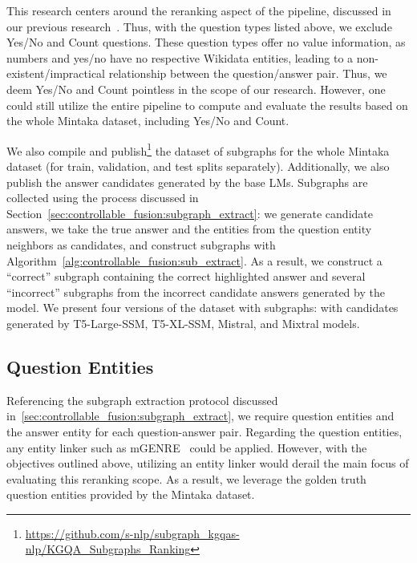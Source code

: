 This research centers around the reranking aspect of the pipeline, discussed in our previous research~\cite{DBLP:conf/paclic/SalnikovLRNBMP23-originalpaper}. Thus, with the question types listed above, we exclude {Yes/No} and {Count} questions. These question types offer no value information, as numbers and yes/no have no respective Wikidata entities, leading to a non-existent/impractical relationship between the question/answer pair. Thus, we deem {Yes/No} and {Count} pointless in the scope of our research. However, one could still utilize the entire pipeline to compute and evaluate the results based on the whole Mintaka dataset, including {Yes/No} and {Count}. 

We also compile and publish\footnote{\url{https://github.com/s-nlp/subgraph_kgqas-nlp/KGQA_Subgraphs_Ranking}} the dataset of subgraphs for the whole Mintaka dataset (for train, validation, and test splits separately). Additionally, we also publish the answer candidates generated by the base LMs. Subgraphs are collected using the process discussed in Section~\ref{sec:controllable_fusion:subgraph_extract}: we generate candidate answers, we take the true answer and the entities from the question entity neighbors as candidates, and construct subgraphs with Algorithm~\ref{alg:controllable_fusion:sub_extract}. As a result, we construct a ``correct'' subgraph containing the correct highlighted answer and several ``incorrect'' subgraphs from the incorrect candidate answers generated by the model. 
We present four versions of the dataset with subgraphs: with candidates generated by {T5-Large-SSM}, {T5-XL-SSM}, {Mistral}, and {Mixtral} models.

\subsection{Question Entities} \label{ques_ent}
Referencing the subgraph extraction protocol discussed in~\ref{sec:controllable_fusion:subgraph_extract}, we require question entities and the answer entity for each question-answer pair. Regarding the question entities, any entity linker such as {mGENRE}~\cite{decao2021multilingual} could be applied. However, with the objectives outlined above, utilizing an entity linker would derail the main focus of evaluating this reranking scope. As a result, we leverage the golden truth question entities provided by the Mintaka dataset. 

